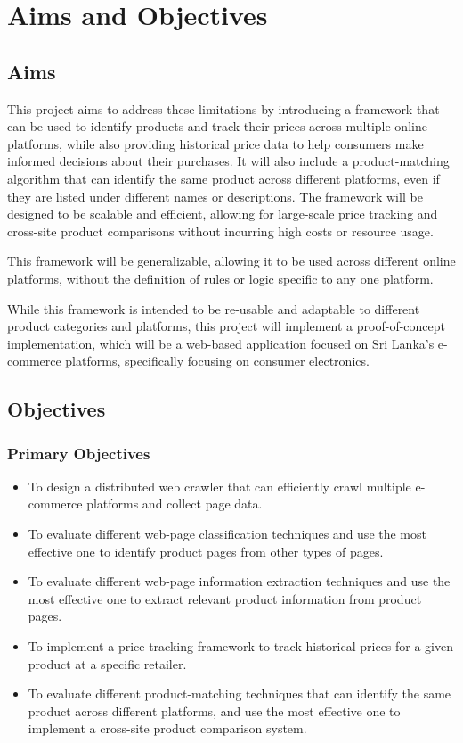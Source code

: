 \section{Aims and Objectives}\label{sec:aims-and-objectives}

\subsection{Aims}\label{subsec:aims}

This project aims to address these limitations by introducing a framework that can be used to identify products and track their prices across multiple online platforms, while also providing historical price data to help consumers make informed decisions about their purchases.
It will also include a product-matching algorithm that can identify the same product across different platforms, even if they are listed under different names or descriptions.
The framework will be designed to be scalable and efficient, allowing for large-scale price tracking and cross-site product comparisons without incurring high costs or resource usage.

This framework will be generalizable, allowing it to be used across different online platforms, without the definition of rules or logic specific to any one platform.

While this framework is intended to be re-usable and adaptable to different product categories and platforms, this project will implement a proof-of-concept implementation, which will be a web-based application focused on Sri Lanka's e-commerce platforms, specifically focusing on consumer electronics.

\subsection{Objectives}\label{subsec:objectives}

\subsubsection{Primary Objectives}\label{subsubsec:primary-objectives}

\begin{itemize}
    \item To design a distributed web crawler that can efficiently crawl multiple e-commerce platforms and collect page data.
    \item To evaluate different web-page classification techniques and use the most effective one to identify product pages from other types of pages.
    \item To evaluate different web-page information extraction techniques and use the most effective one to extract relevant product information from product pages.
    \item To implement a price-tracking framework to track historical prices for a given product at a specific retailer.
    \item To evaluate different product-matching techniques that can identify the same product across different platforms, and use the most effective one to implement a cross-site product comparison system.
\end{itemize}


